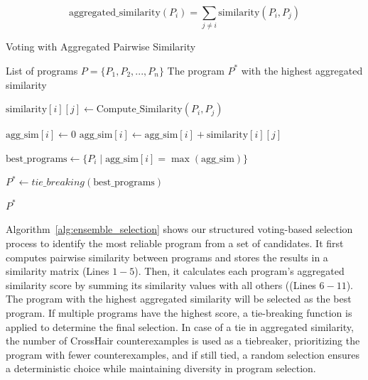 \documentclass{article}
\begin{document}
\begin{equation}
\text{aggregated\_similarity}(P_i) = \sum_{j \neq i} \text{similarity}(P_i, P_j)
\end{equation}

\begin{algorithm}[t!]
\caption{Voting with Aggregated Pairwise Similarity}
\label{alg:ensemble_selection}
\begin{algorithmic}[1]

\Require List of programs \( P = \{P_1, P_2, ..., P_n\} \)
\Ensure The program \( P^* \) with the highest aggregated similarity

        \State \( \text{similarity}[i][j] \gets \text{Compute\_Similarity}(P_i, P_j) \)
    \EndFor
\EndFor

    \State \( \text{agg\_sim}[i] \gets 0 \)
        \State \( \text{agg\_sim}[i] \gets \text{agg\_sim}[i] + \text{similarity}[i][j] \)
    \EndFor
\EndFor

\State \( \text{best\_programs} \gets \{ P_i \mid \text{agg\_sim}[i] = \max(\text{agg\_sim}) \} \)

\State \( P^* \gets tie\_breaking(\text{best\_programs}) \)

\State \Return \( P^* \)

\end{algorithmic}
\end{algorithm}

Algorithm~\ref{alg:ensemble_selection} shows our structured voting-based selection process to identify the most reliable program from a set of candidates. It first computes pairwise similarity between programs and stores the results in a similarity matrix (Lines $1-5$). Then, it calculates each program’s aggregated similarity score by summing its similarity values with all others ((Lines $6-11$). The program with the highest aggregated similarity will be selected as the best program. If multiple programs have the highest score, a tie-breaking function is applied to determine the final selection. In case of a tie in aggregated similarity, the number of CrossHair counterexamples is used as a tiebreaker, prioritizing the program with fewer counterexamples, and if still tied, a random selection ensures a deterministic choice while maintaining diversity in program selection.
\end{document}
